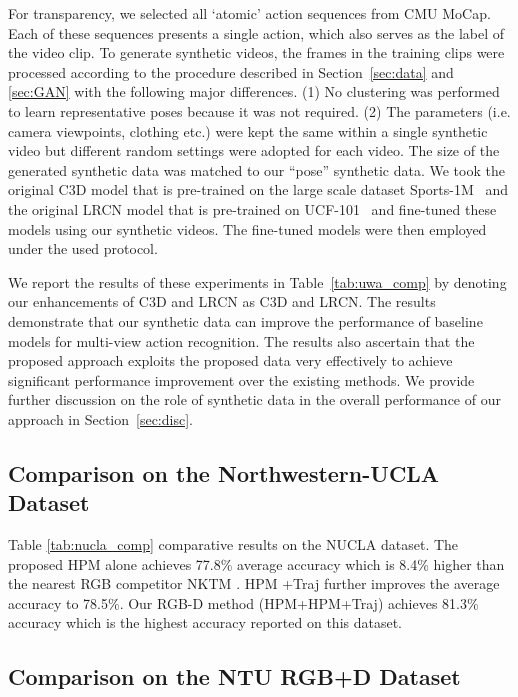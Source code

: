 \documentclass[twocolumn]{svjour3}          \smartqed  \usepackage{graphicx}
\begin{document}
For transparency, we  selected all `atomic' action sequences from CMU MoCap. Each of these sequences presents a single action, which also serves as the label of the video clip. To generate  synthetic videos, the frames in the training clips were processed according to the procedure described in Section~\ref{sec:data} and \ref{sec:GAN} with the following major differences. (1) No clustering was performed to learn representative poses because it was not required. (2) The parameters (i.e.  camera viewpoints, clothing etc.) were kept the same within a single synthetic video but  different  random settings were  adopted for each  video.  The size of the generated synthetic data  was matched to our ``pose''  synthetic data.  We took the  original C3D model that is pre-trained on the large scale dataset Sports-1M~\citep{karpathy2014large} and the original LRCN model that is pre-trained on UCF-101~\citep{soomro2012ucf101} and fine-tuned these models using our synthetic videos.  The fine-tuned models were then employed under the used protocol.

We report the results of these experiments in Table~\ref{tab:uwa_comp} by denoting our enhancements of C3D and LRCN as C3D and LRCN. The results demonstrate that our synthetic data can improve the performance of baseline models for multi-view action recognition. The results also ascertain that  the proposed approach exploits the proposed data very effectively to achieve significant performance improvement over the existing methods.  We provide further discussion on the role of synthetic data in the overall performance of our approach in Section~\ref{sec:disc}.

\subsection{Comparison on the Northwestern-UCLA Dataset}
\label{sec:NUCLA}

Table \ref{tab:nucla_comp} comparative results on the NUCLA dataset. The proposed HPM alone achieves 77.8\% average accuracy which is 8.4\% higher than the nearest RGB competitor NKTM \citep{NKTM}. HPM +Traj further improves the average accuracy to 78.5\%. Our RGB-D method (HPM+HPM+Traj) achieves 81.3\% accuracy which is the highest accuracy reported on this dataset.

\subsection{Comparison on the NTU RGB+D Dataset}
\end{document}
